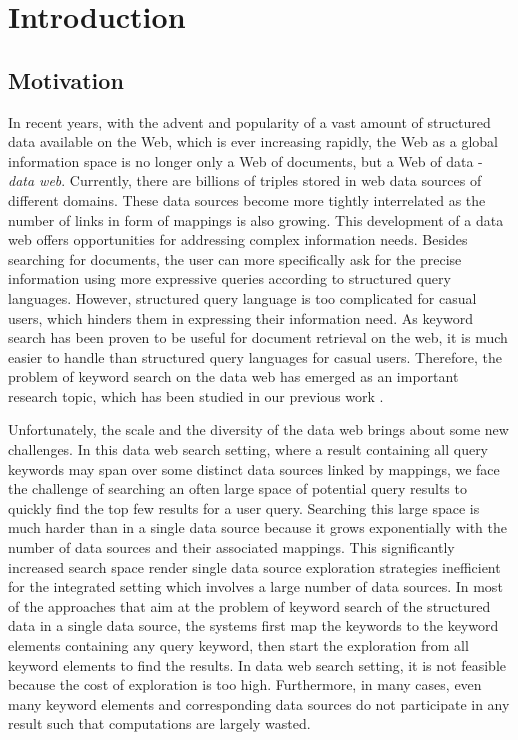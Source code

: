 \chapter{Introduction}\label{intro}

\section{Motivation}\label{intro:motivation}
In recent years, with the advent and popularity of a vast amount of structured data available on the
Web, which is ever increasing rapidly, the Web as a global information space is no longer only a Web
of documents, but a Web of data - {\em data web}. Currently, there are billions of triples stored in
web data sources of different domains. These data sources become more tightly interrelated as the
number of links in form of mappings is also growing. This development of a data web offers
opportunities for addressing complex information needs. Besides searching for documents, the user can
more specifically ask for the precise information using more expressive queries according to
structured query languages. However, structured query language is too complicated for casual users,
which hinders them in expressing their information need. As keyword search has been proven to be
useful for document retrieval on the web, it is much easier to handle than structured query languages
for casual users. Therefore, the problem of keyword search on the data web has emerged as an
important research topic, which has been studied in our previous work \citep{TranTR}.

Unfortunately, the scale and the diversity of the data web brings about some new challenges. In this
data web search setting, where a result containing all query keywords may span over some distinct
data sources linked by mappings, we face the challenge of searching an often large space of potential
query results to quickly find the top few results for a user query. Searching this large space is
much harder than in a single data source because it grows exponentially with the number of data
sources and their associated mappings. This significantly increased search space render single data
source exploration strategies inefficient for the integrated setting which involves a large number of
data sources. In most of the approaches that aim at the problem of keyword search of the structured
data in a single data source, the systems first map the keywords to the keyword elements containing
any query keyword, then start the exploration from all keyword elements to find the results. In data
web search setting, it is not feasible because the cost of exploration is too high. Furthermore, in
many cases, even many keyword elements and corresponding data sources do not participate in any
result such that computations are largely wasted.

